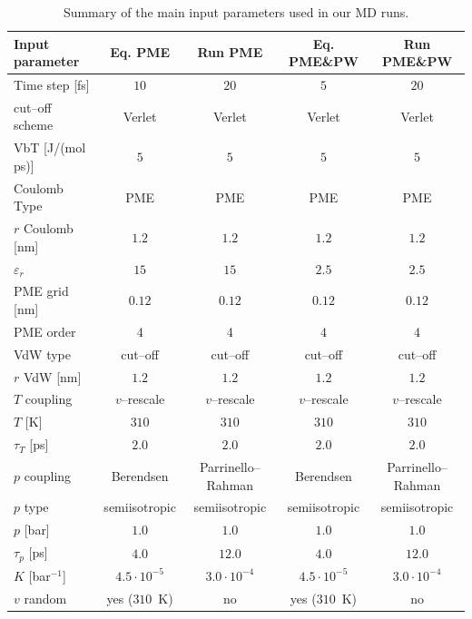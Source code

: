 \begin{table}[h!t]
	\centering\footnotesize
	\begin{tabular}{lcccc}
		\toprule
		Input parameter & Eq. \acs{PME} & Run \acs{PME} & Eq. \acs{PME}\&\acs{PW} & Run \acs{PME}\&\acs{PW} \\ \toprule
		Time step [fs]		& $10$ & $20$ & $5$ & $20$ \\ \midrule
		cut--off scheme		& Verlet & Verlet & Verlet & Verlet \\ \midrule
		VbT [J/(mol ps)]	& $5$ & $5$ & $5$ & $5$ \\ \midrule
		Coulomb Type		& \acs{PME}	& \acs{PME}	& \acs{PME} & \acs{PME} \\ \midrule
		$r$ Coulomb	[nm]	& $1.2$ & $1.2$ & $1.2$ & $1.2$ \\ \midrule
		$\varepsilon_r$		& $15$ & $15$ & $2.5$ & $2.5$ \\ \midrule
		\acs{PME} grid [nm]	& $0.12$ & $0.12$ & $0.12$ & $0.12$ \\ \midrule
	    \acs{PME} order		& $4$ & $4$ & $4$ & $4$ \\ \midrule
		VdW type			& cut--off & cut--off & cut--off & cut--off \\ \midrule
		$r$ VdW [nm]		& $1.2$ & $1.2$ & $1.2$ & $1.2$ \\ \midrule
		$T$ coupling		& $v$--rescale & $v$--rescale & $v$--rescale & $v$--rescale \\ \midrule
		$T$ [K]				& $310$ & $310$ & $310$ & $310$  \\ \midrule
		$\tau_T$ [ps]		& $2.0$ & $2.0$ & $2.0$ & $2.0$ \\ \midrule
		$p$ coupling		& Berendsen & Parrinello--Rahman & Berendsen & Parrinello--Rahman \\ \midrule
		$p$ type			& semiisotropic & semiisotropic & semiisotropic & semiisotropic \\ \midrule
		$p$ [bar]			& $1.0$ & $1.0$ & $1.0$ & $1.0$ \\ \midrule
		$\tau_p$ [ps]		& $4.0$ & $12.0$ & $4.0$ & $12.0$ \\ \midrule
		$K$ [bar$^{-1}$]	& $4.5\cdot 10^{-5}$ & $3.0\cdot 10^{-4}$ & $4.5\cdot 10^{-5}$ & $3.0\cdot 10^{-4}$ \\ \midrule
		$v$ random			& yes ($310$~K) & no & yes ($310$~K) & no \\ \bottomrule 
	\end{tabular}
	\caption{Summary of the main input parameters used in our \acs{MD} runs.}
	\label{tab:inputParam}
\end{table}

